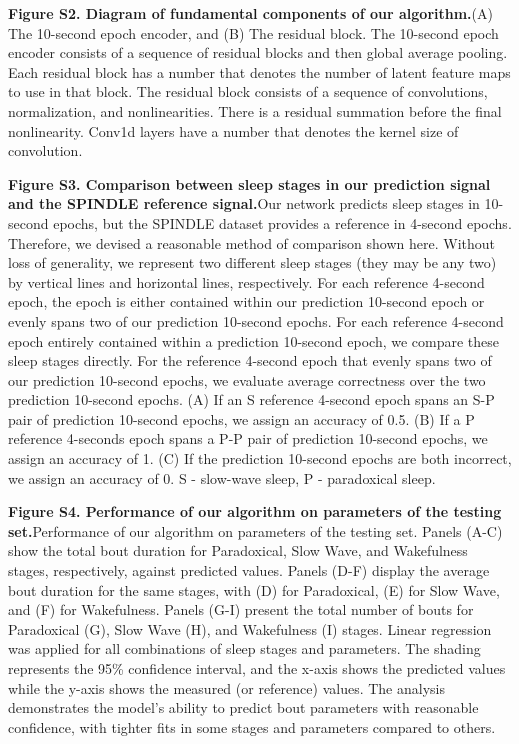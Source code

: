 \documentclass[pdflatex,sn-mathphys-num]{sn-jnl}%
\theoremstyle{thmstyleone}%
\theoremstyle{thmstyletwo}%
\theoremstyle{thmstylethree}%
\begin{document}
\vspace{12pt} %

\noindent
\textbf{Figure S2. Diagram of fundamental components of our algorithm.}\quad (A) The 10-second epoch encoder, and (B) The residual block. The 10-second epoch encoder consists of a sequence of residual blocks and then global average pooling. Each residual block has a number that denotes the number of latent feature maps to use in that block. The residual block consists of a sequence of convolutions, normalization, and nonlinearities. There is a residual summation before the final nonlinearity. Conv1d layers have a number that denotes the kernel size of convolution.
\vspace{12pt} %

\noindent
\textbf{Figure S3. Comparison between sleep stages in our prediction signal and the SPINDLE reference signal.}\quad Our network predicts sleep stages in 10-second epochs, but the SPINDLE dataset provides a reference in 4-second epochs. Therefore, we devised a reasonable method of comparison shown here. Without loss of generality, we represent two different sleep stages (they may be any two) by vertical lines and horizontal lines, respectively. For each reference 4-second epoch, the epoch is either contained within our prediction 10-second epoch or evenly spans two of our prediction 10-second epochs. For each reference 4-second epoch entirely contained within a prediction 10-second epoch, we compare these sleep stages directly. For the reference 4-second epoch that evenly spans two of our prediction 10-second epochs, we evaluate average correctness over the two prediction 10-second epochs. (A) If an S reference 4-second epoch spans an S-P pair of prediction 10-second epochs, we assign an accuracy of 0.5. (B) If a P reference 4-seconds epoch spans a P-P pair of prediction 10-second epochs, we assign an accuracy of 1. (C) If the prediction 10-second epochs are both incorrect, we assign an accuracy of 0. S - slow-wave sleep, P - paradoxical sleep.
\vspace{12pt} %

\noindent
\textbf{Figure S4. Performance of our algorithm on parameters of the testing set.}\quad Performance of our algorithm on parameters of the testing set. Panels (A-C) show the total bout duration for Paradoxical, Slow Wave, and Wakefulness stages, respectively, against predicted values. Panels (D-F) display the average bout duration for the same stages, with (D) for Paradoxical, (E) for Slow Wave, and (F) for Wakefulness. Panels (G-I) present the total number of bouts for Paradoxical (G), Slow Wave (H), and Wakefulness (I) stages. Linear regression was applied for all combinations of sleep stages and parameters. The shading represents the 95\% confidence interval, and the x-axis shows the predicted values while the y-axis shows the measured (or reference) values. The analysis demonstrates the model's ability to predict bout parameters with reasonable confidence, with tighter fits in some stages and parameters compared to others.
\vspace{12pt} %
\end{document}
